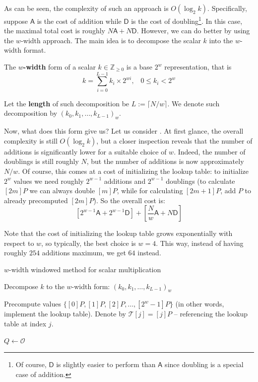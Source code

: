 \documentclass{iacrtrans}
\begin{document}
As can be seen, the complexity of such an approach is $O(\log_2k)$. Specifically, suppose $\mathsf{A}$ is the cost of addition while $\mathsf{D}$ is the cost of doubling\footnote{Of course, $\mathsf{D}$ is slightly easier to perform than $\mathsf{A}$ since doubling is a special case of addition.}. In this case, the maximal total cost is roughly $N\mathsf{A} + N\mathsf{D}$. However, we can do better by using the $w$-width approach. The main idea is to decompose the scalar $k$ into the $w$-width format. 
\begin{definition}
The \textbf{$w$-width} form of a scalar $k \in \mathbb{Z}_{\geq 0}$ is a base $2^w$ representation, that is
\begin{equation}
    k = \sum_{i=0}^{L-1}k_i\times 2^{wi}, \;\;\; 0 \leq k_i < 2^w 
\end{equation}

Let the \textbf{length} of such decomposition be $L := \lceil N/w \rceil$. We denote such decomposition by $(k_0,k_1,\dots,k_{L-1})_w$.
\end{definition}

Now, what does this form give us? Let us consider . At first glance, the overall complexity is still $O(\log_2k)$, but a closer inspection reveals that the number of additions is significantly lower for a suitable choice of $w$. Indeed, the number of doublings is still roughly $N$, but the number of additions is now approximately $N/w$. Of course, this comes at a cost of initializing the lookup table: to initialize $2^w$ values we need roughly $2^{w-1}$ additions and $2^{w-1}$ doublings (to calculate $[2m]P$ we can always double $[m]P$, while for calculating $[2m+1]P$, add $P$ to already precomputed $[2m]P$). So the overall cost is:
\begin{equation}
    \left[2^{w-1}\mathsf{A} + 2^{w-1}\mathsf{D}\right] + \left[\frac{N}{w}\mathsf{A} + N\mathsf{D}\right]
\end{equation}

Note that the cost of initializing the lookup table grows exponentially with respect to $w$, so typically, the best choice is $w=4$. This way, instead of having roughly $254$ additions maximum, we get $64$ instead.

\begin{algorithm}
\caption{$w$-width windowed method for scalar multiplication}\label{alg:windowed}

Decompose $k$ to the $w$-width form: $(k_0,k_1,\dots,k_{L-1})_w$

Precompute values $\{[0]P,[1]P,[2]P,\dots,[2^w-1]P\}$ (in other words, implement the lookup table). Denote by $\mathcal{T}[j] = [j]P$ -- referencing the lookup table at index $j$.

$Q \gets \mathcal{O}$


\end{algorithm}
\end{document}
